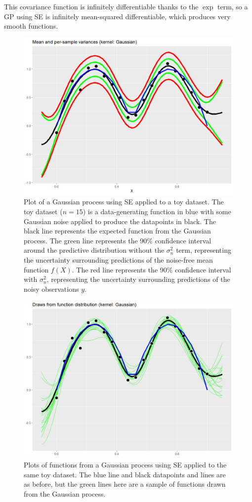 \documentclass[10pt]{article}
\begin{document}
This covariance function is infinitely differentiable thanks to the $\exp$ term, so a GP using SE is infinitely mean-squared differentiable, which produces very smooth functions.

\begin{figure}[h]
    \includegraphics[height=0.5\textwidth]{gaussian_variances.png}
    \caption{
        Plot of a Gaussian process using SE applied to a toy dataset. The toy dataset ($n = 15$) is a data-generating function in blue with some Gaussian noise applied to produce the datapoints in black. The black line represents the expected function from the Gaussian process. The green line represents the 90\% confidence interval around the predictive distribution without the $\sigma^2_n$ term, representing the uncertainty surrounding predictions of the noise-free mean function $f(X)$. The red line represents the 90\% confidence interval with $\sigma^2_n$, representing the uncertainty surrounding predictions of the noisy observations $y$.
    }
\end{figure}

\begin{figure}[h]
    \includegraphics[height=0.5\textwidth]{gaussian_draws.png}
    \caption{
        Plots of functions from a Gaussian process using SE applied to the same toy dataset. The blue line and black datapoints and lines are as before, but the green lines here are a sample of functions drawn from the Gaussian process.
    }
\end{figure}
\end{document}
